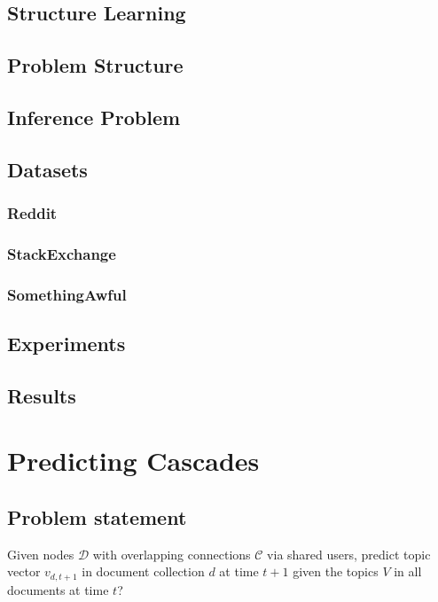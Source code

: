 \documentclass{article} %
\begin{document}
\subsection{Structure Learning}
\subsection{Problem Structure}

\subsection{Inference Problem}

\subsection{Datasets}

\subsubsection{Reddit}
\subsubsection{StackExchange}
\subsubsection{SomethingAwful}

\subsection{Experiments}
\label{experiments}

\subsection{Results}
\label{results}

\section{Predicting Cascades}

\subsection{Problem statement}
Given nodes $\mathcal{D}$ with overlapping connections $\mathcal{C}$ via shared users, predict topic vector $v_{d,t+1}$ in document collection $d$ at time $t+1$ given the topics $V$ in all documents at time $t$?
\end{document}
